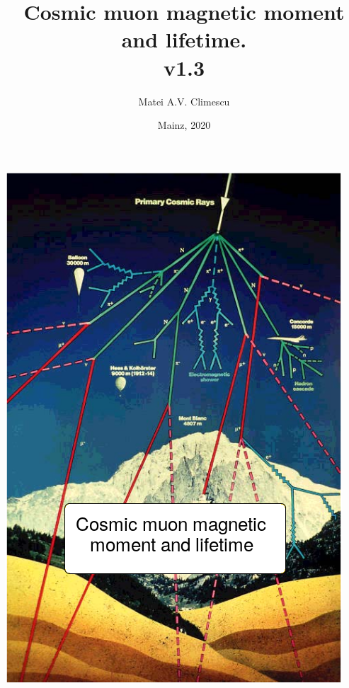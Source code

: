 \documentclass[12pt]{report}
\title{Cosmic muon magnetic moment and lifetime.\\
	\large v1.3}
\author{Matei A.V. Climescu}
\date{Mainz, 2020}
\newenvironment{changemargin}[2]{%
\begin{list}{}{%
\setlength{\topsep}{0pt}%
\setlength{\leftmargin}{#1}%
\setlength{\rightmargin}{#2}%
\setlength{\listparindent}{\parindent}%
\setlength{\itemindent}{\parindent}%
\setlength{\parsep}{\parskip}%
}%
\item[]}{\end{list}}
\begin{document}
\maketitle
\begin{titlepage}
\begin{changemargin}{-0cm}{-0cm}
\includegraphics[width=\linewidth]{./fig/cover.png}
\end{changemargin}
\end{titlepage}


    
    
    
    
    
    
    




\end{document}
